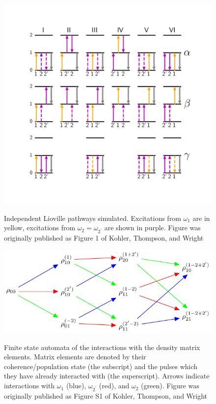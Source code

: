 \documentclass[fontsize=11pt]{scrartcl}
\numberwithin{equation}{section}		%
\numberwithin{figure}{section}			%
\numberwithin{table}{section}				%
\begin{document}
\begin{figure}[!b]
    \centering
   \includegraphics[scale=.9]{"WMELs"}
    \label{fig:WMELs}
    \caption{Independent Lioville pathways simulated. Excitations from $\omega_1$ are in yellow, excitations from $\omega_2 = \omega_{2^\prime}$ are shown in purple. Figure was originally published as Figure 1 of Kohler, Thompson, and Wright\cite{Kohler_2017} }
\end{figure}
\begin{figure}[!htb]
    \centering
    \includegraphics[scale=1]{"matrix flow diagram"}
    \label{fig:flow_diagram}
    \caption{Finite state automata of the interactions with the density matrix elements. Matrix elements are denoted by their coherence/population state (the subscript) and the pulses which they have already interacted with (the superscript). Arrows indicate interactions with $\omega_1$ (blue), $\omega_{2^\prime}$ (red), and $\omega_2$ (green). Figure was originally published as Figure S1 of Kohler, Thompson, and Wright\cite{Kohler_2017}}
\end{figure}
\end{document}
